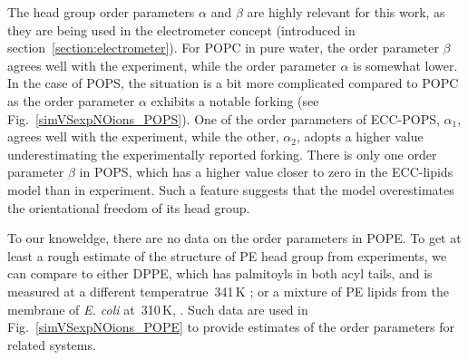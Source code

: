 The head group order parameters $\alpha$ and $\beta$ are highly relevant for this work,
as they are being used in the electrometer concept (introduced in section~\ref{section:electrometer}). 
For POPC in pure water, the order parameter $\beta$ agrees well with the experiment, 
while the order parameter $\alpha$ is somewhat lower. 
In the case of POPS, the situation is a bit more complicated
compared to POPC as the order parameter $\alpha$ exhibits a notable forking (see Fig.~\ref{simVSexpNOions_POPS}).
One of the order parameters of ECC-POPS, $\alpha_1$, agrees well with the experiment, 
while the other, $\alpha_2$, adopts a higher value underestimating the experimentally reported forking. 
There is only one order parameter $\beta$ in POPS, 
which has a higher value closer to zero in the ECC-lipids model than in experiment. 
Such a feature suggests that the model overestimates the orientational freedom of its head group. 

To our knoweldge, there are no data on the order parameters in POPE. 
To get at least a rough estimate of the structure of PE head group from experiments, 
we can compare to either DPPE, which has palmitoyls in both acyl tails, and is measured at a different temperatrue~341\,K \citep{seelig76, seelig80};
or a mixture of PE lipids from the membrane of \emph{E. coli} at~310\,K, \citep{gally81}. 
Such data are used in Fig.~\ref{simVSexpNOions_POPE} to provide estimates of the order parameters for related systems. 
 
 
 

